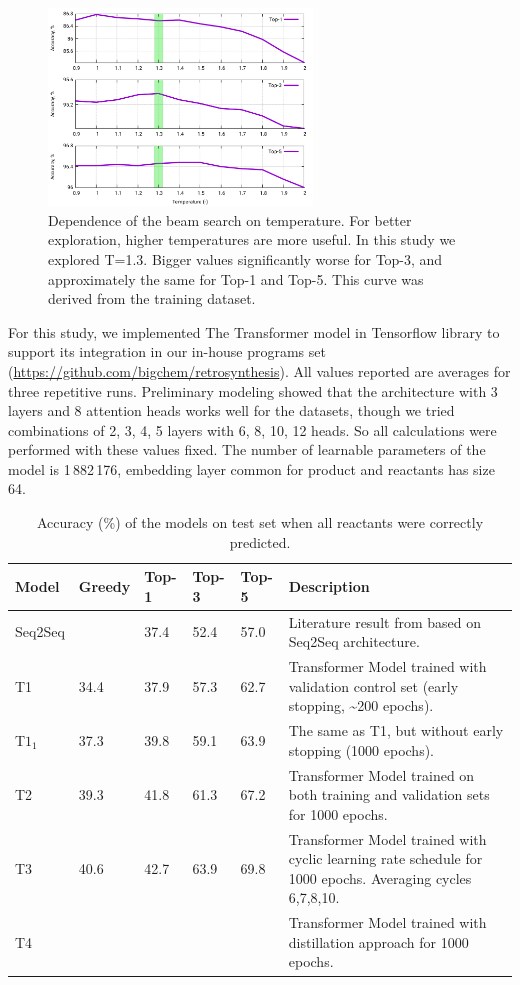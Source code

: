 \documentclass{article}
\begin{document}
\begin{figure}  
  \vspace{-0.5cm}
  \includegraphics[width = 7cm]{images/tempdep.pdf}
  \caption{Dependence of the beam search on temperature. For better exploration, higher temperatures are more useful. In this study we explored T=1.3. Bigger values significantly worse for Top-3, and approximately the same for Top-1 and Top-5. This curve was derived from the training dataset.}
  \label{fig:tempdep}
  \vspace{-0.2cm}
\end{figure}
For this study, we implemented The Transformer model in Tensorflow library to support its integration in our in-house programs set (\url{https://github.com/bigchem/retrosynthesis}).  All values reported are averages for three repetitive runs. Preliminary modeling showed that the architecture with 3 layers and 8 attention heads works well for the datasets, though we tried combinations of 2, 3, 4, 5 layers with 6, 8, 10, 12 heads. So all calculations were performed with these values fixed.  The number of learnable parameters of the model is 1\,882\,176, embedding layer common for product and reactants has size 64.
\begin{table}[b!]
  \caption{Accuracy (\%) of the models on test set when all reactants were correctly predicted.}
  \centering
  \begin{tabular}{p{2cm}p{1cm}p{1cm}p{1cm}p{1cm}p{8cm}}
    \toprule
    Model & Greedy & Top-1 & Top-3 & Top-5 & Description\\
    \midrule
    Seq2Seq &  & 37.4  & 52.4 & 57.0 & Literature result from \cite{Pande} based on Seq2Seq architecture. \\ \midrule
    T1         & 34.4 & 37.9 & 57.3 & 62.7 & Transformer Model trained with validation control set (early stopping, \textasciitilde 200 epochs). \\
    T$1_1$ & 37.3 & 39.8 & 59.1 & 63.9 & The same as T1, but without early stopping (1000 epochs). \\ 
    T2         & 39.3 & 41.8 & 61.3 & 67.2 & Transformer Model trained on both training and validation sets for 1000 epochs.\\
    T3         & 40.6 & 42.7 & 63.9 & 69.8 & Transformer Model trained with cyclic learning rate schedule for 1000 epochs. Averaging cycles 6,7,8,10.\\
    T4         & &  &  &  & Transformer Model trained with distillation approach \cite{Hinton} for 1000 epochs.\\ 
    \bottomrule
  \end{tabular}
  \label{tbl:results}
\end{table}
\end{document}
